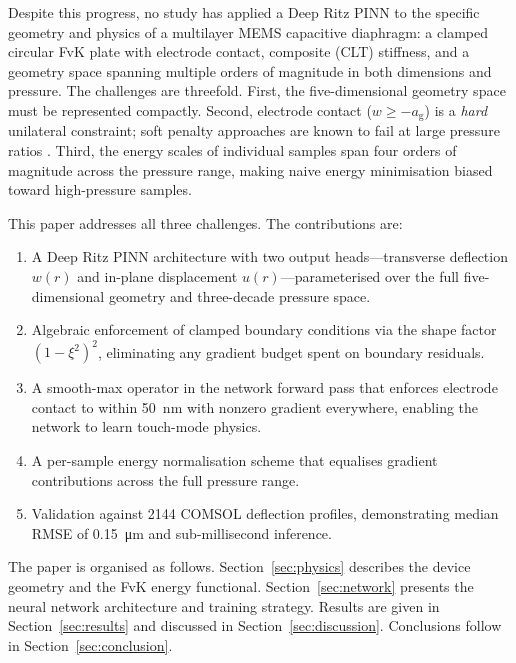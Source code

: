 \documentclass[review,12pt]{elsarticle}
\begin{document}
Despite this progress, no study has applied a Deep Ritz PINN to the specific
geometry and physics of a multilayer MEMS capacitive diaphragm: a
clamped circular FvK plate with electrode contact, composite (CLT) stiffness,
and a geometry space spanning multiple orders of magnitude in both dimensions
and pressure. The challenges are threefold. First, the five-dimensional
geometry space must be represented compactly. Second, electrode contact
($w \ge -a_\mathrm{g}$) is a \emph{hard} unilateral constraint; soft penalty
approaches are known to fail at large pressure ratios
\cite{e2018,samaniego2020}. Third, the energy scales of individual samples span
four orders of magnitude across the pressure range, making naive energy
minimisation biased toward high-pressure samples.

This paper addresses all three challenges. The contributions are:
\begin{enumerate}
    \item A Deep Ritz PINN architecture with two output heads—transverse
          deflection $w(r)$ and in-plane displacement $u(r)$—parameterised over
          the full five-dimensional geometry and three-decade pressure space.
    \item Algebraic enforcement of clamped boundary conditions via the
          shape factor $(1-\xi^2)^2$, eliminating any gradient budget spent on
          boundary residuals.
    \item A smooth-max operator in the network forward pass that enforces
          electrode contact to within \SI{50}{nm} with nonzero gradient
          everywhere, enabling the network to learn touch-mode physics.
    \item A per-sample energy normalisation scheme that equalises gradient
          contributions across the full pressure range.
    \item Validation against 2144 COMSOL deflection profiles, demonstrating
          median RMSE of \SI{0.15}{\micro\metre} and sub-millisecond inference.
\end{enumerate}

The paper is organised as follows. Section~\ref{sec:physics} describes the
device geometry and the FvK energy functional. Section~\ref{sec:network}
presents the neural network architecture and training strategy. Results are
given in Section~\ref{sec:results} and discussed in
Section~\ref{sec:discussion}. Conclusions follow in
Section~\ref{sec:conclusion}.

\end{document}
